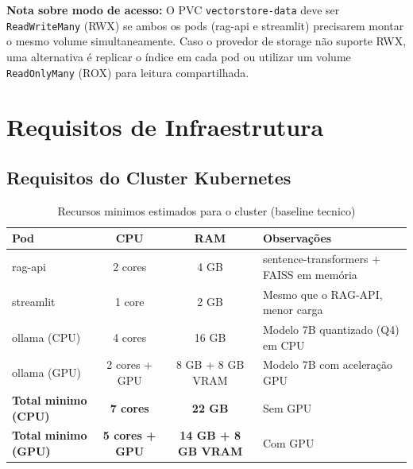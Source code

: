 \documentclass[12pt, a4paper]{article}
\begin{document}
\noindent\textbf{Nota sobre modo de acesso:} O PVC \texttt{vectorstore-data} deve ser \texttt{ReadWriteMany} (RWX) se ambos os pods (rag-api e streamlit) precisarem montar o mesmo volume simultaneamente. Caso o provedor de storage não suporte RWX, uma alternativa é replicar o índice em cada pod ou utilizar um volume \texttt{ReadOnlyMany} (ROX) para leitura compartilhada.
\section{Requisitos de Infraestrutura}

\subsection{Requisitos do Cluster Kubernetes}

\begin{table}[H]
\centering
\small
\caption{Recursos minimos estimados para o cluster (baseline tecnico)}
\label{tab:recursos_cluster}
\begin{tabularx}{\textwidth}{l c c X}
\toprule
\textbf{Pod} & \textbf{CPU} & \textbf{RAM} & \textbf{Observações} \\
\midrule
rag-api & 2 cores & 4 GB & sentence-transformers + FAISS em memória \\
streamlit & 1 core & 2 GB & Mesmo que o RAG-API, menor carga \\
ollama (CPU) & 4 cores & 16 GB & Modelo 7B quantizado (Q4) em CPU \\
ollama (GPU) & 2 cores + GPU & 8 GB + 8 GB VRAM & Modelo 7B com aceleração GPU \\
\midrule
\textbf{Total minimo (CPU)} & \textbf{7 cores} & \textbf{22 GB} & Sem GPU \\
\textbf{Total minimo (GPU)} & \textbf{5 cores + GPU} & \textbf{14 GB + 8 GB VRAM} & Com GPU \\
\bottomrule
\end{tabularx}
\end{table}
\end{document}
